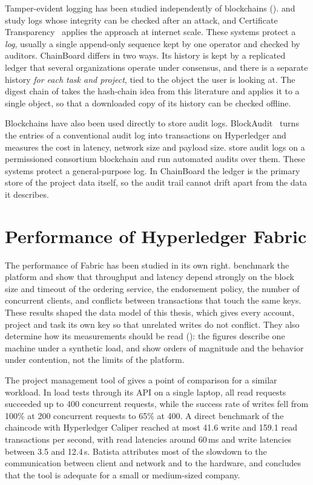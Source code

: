 Tamper-evident logging has been studied independently of blockchains (). \textcite{schneier1999secure} and \textcite{crosby2009tamper} study logs whose integrity can be checked after an attack, and Certificate Transparency~\cite{rfc6962} applies the approach at internet scale. These systems protect a \emph{log}, usually a single append-only sequence kept by one operator and checked by auditors. ChainBoard differs in two ways. Its history is kept by a replicated ledger that several organizations operate under consensus, and there is a separate history \emph{for each task and project}, tied to the object the user is looking at. The digest chain of  takes the hash-chain idea from this literature and applies it to a single object, so that a downloaded copy of its history can be checked offline.

Blockchains have also been used directly to store audit logs. BlockAudit~\cite{ahmad2018blockaudit} turns the entries of a conventional audit log into transactions on Hyperledger and measures the cost in latency, network size and payload size. \textcite{belchior2020audits} store audit logs on a permissioned consortium blockchain and run automated audits over them. These systems protect a general-purpose log. In ChainBoard the ledger is the primary store of the project data itself, so the audit trail cannot drift apart from the data it describes.

\section{Performance of Hyperledger Fabric}
\label{sec:related-performance}

The performance of Fabric has been studied in its own right. \textcite{thakkar2018performance} benchmark the platform and show that throughput and latency depend strongly on the block size and timeout of the ordering service, the endorsement policy, the number of concurrent clients, and conflicts between transactions that touch the same keys. These results shaped the data model of this thesis, which gives every account, project and task its own key so that unrelated writes do not conflict. They also determine how its measurements should be read (): the figures describe one machine under a synthetic load, and show orders of magnitude and the behavior under contention, not the limits of the platform.

The project management tool of \textcite{batista2021} gives a point of comparison for a similar workload. In load tests through its API on a single laptop, all read requests succeeded up to 400 concurrent requests, while the success rate of writes fell from 100\% at 200 concurrent requests to 65\% at 400. A direct benchmark of the chaincode with Hyperledger Caliper reached at most 41.6 write and 159.1 read transactions per second, with read latencies around 60\,ms and write latencies between 3.5 and 12.4\,s. Batista attributes most of the slowdown to the communication between client and network and to the hardware, and concludes that the tool is adequate for a small or medium-sized company.

